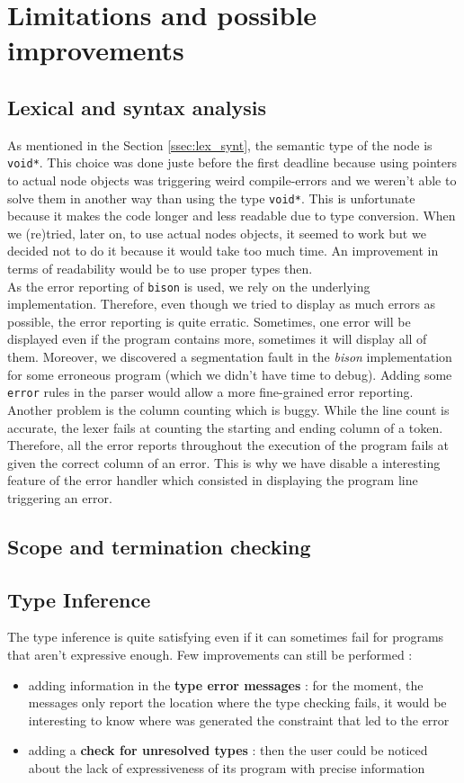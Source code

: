 \documentclass[a4paper,11pt]{article}
\begin{document}
\section{Limitations and possible improvements}
\subsection{Lexical and syntax analysis}
\label{ssec:flaws_syntax}
As mentioned in the Section \ref{ssec:lex_synt}, the semantic type of the node is \texttt{void*}. This choice was done juste before the first deadline because using pointers to actual node objects was triggering weird compile-errors and we weren't able to solve them in another way than using the type \texttt{void*}. This is unfortunate because it makes the code longer and less readable due to type conversion. When we (re)tried, later on, to use actual nodes objects, it seemed to work but we decided not to do it because it would take too much time. An improvement in terms of readability would be to use proper types then.
\\
As the error reporting of \texttt{bison} is used, we rely on the underlying implementation. Therefore, even though we tried to display as much errors as possible, the error reporting is quite erratic. Sometimes, one error will be displayed even if the program contains more, sometimes it will display all of them. Moreover, we discovered a segmentation fault in the \textit{bison} implementation for some erroneous program (which we didn't have time to debug). Adding some \texttt{error} rules in the parser would allow a more fine-grained error reporting. \\
Another problem is the column counting which is buggy. While the line count is accurate, the lexer fails at counting the starting and ending column of a token. Therefore, all the error reports throughout the execution of the program fails at given the correct column of an error. This is why we have disable a interesting feature of the error handler which consisted in displaying the program line triggering an error.
\subsection{Scope and termination checking}
\subsection{Type Inference}
The type inference is quite satisfying even if it can sometimes fail for programs that aren't expressive enough. Few improvements can still be performed :
\begin{itemize}
	\item adding information in the \textbf{type error messages} : for the moment, the messages only report the location where the type checking fails, it would be interesting to know where was generated the constraint that led to the error
	\item adding a \textbf{check for unresolved types} : then the user could be noticed about the lack of expressiveness of its program with precise information
\end{itemize} 
\end{document}
